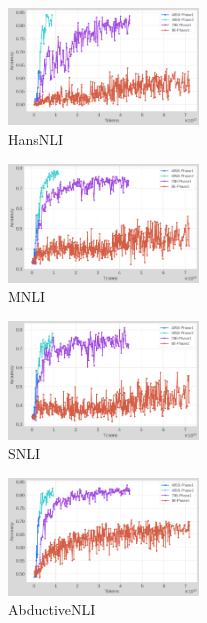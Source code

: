 \begin{figure}[t]
    \centering
    \includegraphics[width=0.45\textwidth]{nli_plots/hansnli_intermediate.png}
    \caption{HansNLI}
    \label{fig:hansnli_int}
\end{figure}

\begin{figure}[t]
    \centering
    \includegraphics[width=0.45\textwidth]{nli_plots/mnli_matched_intermediate.png}
    \caption{MNLI}
    \label{fig:mnli_int}
\end{figure}

\begin{figure}[t]
    \centering
    \includegraphics[width=0.45\textwidth]{nli_plots/snli_intermediate.png}
    \caption{SNLI}
    \label{fig:snli_int}
\end{figure}

\begin{figure}[t]
    \centering
    \includegraphics[width=0.45\textwidth]{nli_plots/abductivenli_intermediate.png}
    \caption{AbductiveNLI}
    \label{fig:abductivenli_int}
\end{figure}

